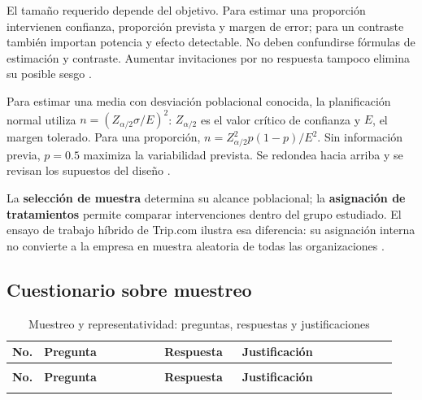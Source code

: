 {El tamaño requerido depende del objetivo. Para estimar una proporción intervienen confianza, proporción prevista y margen de error; para un contraste también importan potencia y efecto detectable. No deben confundirse fórmulas de estimación y contraste. Aumentar invitaciones por no respuesta tampoco elimina su posible sesgo \citep{holmesBusiness2023,nistHandbook}.

Para estimar una media con desviación poblacional conocida, la planificación normal utiliza \(n=(Z_{\alpha/2}\sigma/E)^2\): \(Z_{\alpha/2}\) es el valor crítico de confianza y \(E\), el margen tolerado. Para una proporción, \(n=Z_{\alpha/2}^{2}p(1-p)/E^{2}\). Sin información previa, \(p=0.5\) maximiza la variabilidad prevista. Se redondea hacia arriba y se revisan los supuestos del diseño \citep[sec.~8.4]{holmesBusiness2023}.

La \textbf{selección de muestra} determina su alcance poblacional; la \textbf{asignación de tratamientos} permite comparar intervenciones dentro del grupo estudiado. El ensayo de trabajo híbrido de Trip.com ilustra esa diferencia: su asignación interna no convierte a la empresa en muestra aleatoria de todas las organizaciones \citep{bloom2024}.

\pagestyle{empty}
\begin{landscape}
\subsection{Cuestionario sobre muestreo}
\begingroup
\fontsize{10}{13}\selectfont{}
\setlength{\tabcolsep}{4pt}\renewcommand{\arraystretch}{1.25}
\setlength{\LTpre}{0pt}\setlength{\LTpost}{8pt}
\begin{longtable}{@{}>{\centering\arraybackslash}p{0.035\linewidth}>{\raggedright\arraybackslash}p{0.31\linewidth}>{\raggedright\arraybackslash}p{0.20\linewidth}>{\raggedright\arraybackslash}p{0.40\linewidth}@{}}
\caption{Muestreo y representatividad: preguntas, respuestas y justificaciones}\label{tab:cuestionario-muestreo}\\
\toprule
\textbf{No.} & \textbf{Pregunta} & \textbf{Respuesta} & \textbf{Justificación}\\
\midrule\endfirsthead
\multicolumn{4}{l}{\textit{Continuación del cuestionario sobre muestreo}}\\
\toprule
\textbf{No.} & \textbf{Pregunta} & \textbf{Respuesta} & \textbf{Justificación}\\
\midrule\endhead
\bottomrule\endfoot
\bottomrule\endlastfoot

\end{longtable}
\endgroup
\end{landscape}
\pagestyle{fancy}

}
